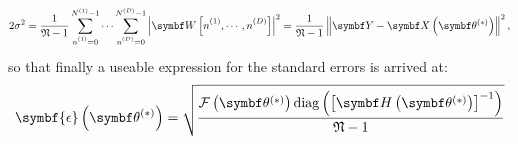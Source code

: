\begin{equation}
    2 \sigma^2 = \frac{1}{\mathfrak{N} - 1}
    \sum_{\none=0}^{\None - 1} \cdots
    \sum_{\nD=0}^{\ND - 1}
    \left\lvert \bW \left[\none, \cdots, \nD \right] \right\rvert^2 =
    \frac{1}{\mathfrak{N} - 1} \left \lVert
        \bY - \bXthstar
    \right \rVert^2,
\end{equation}
so that finally a useable expression for the standard errors is arrived at:
\begin{equation}
    \symbf{\epsilon}\left(\bthstar\right) =
        \sqrt{
            \frac
            {
                \Fthstar \diag \left(
                    \left[\bdHthstar\right]^{-1}
                \right)
            }
            {\mathfrak{N} - 1}
        }
\end{equation}


